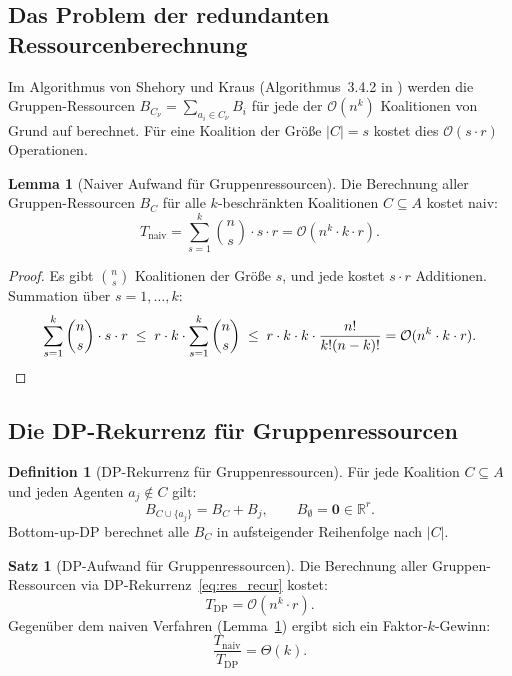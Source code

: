 \documentclass[a4paper,12pt]{article}
\theoremstyle{definition}
\newtheorem{definition}{Definition}
\newtheorem{satz}{Satz}
\newtheorem{lemma}{Lemma}
\begin{document}
\subsection{Das Problem der redundanten Ressourcenberechnung}

Im Algorithmus von Shehory und Kraus (Algorithmus~3.4.2 in \cite{sk98}) werden
die Gruppen-Ressourcen $B_{C_\nu} = \sum_{a_i \in C_\nu} B_i$ f\"{u}r jede der
$\mathcal{O}(n^k)$ Koalitionen von Grund auf berechnet. F\"{u}r eine Koalition
der Gr\"{o}{\ss}e $|C| = s$ kostet dies $\mathcal{O}(s \cdot r)$ Operationen.

\begin{lemma}[Naiver Aufwand f\"{u}r Gruppenressourcen]
    \label{lemma:naive_cost}
    Die Berechnung aller Gruppen-Ressourcen $B_C$ f\"{u}r alle
    $k$-beschr\"{a}nkten Koalitionen $C \subseteq A$ kostet naiv:
    \[
        T_{\mathrm{naiv}} = \sum_{s=1}^k \binom{n}{s} \cdot s \cdot r
        = \mathcal{O}(n^k \cdot k \cdot r).
    \]
\end{lemma}

\begin{proof}
    Es gibt $\binom{n}{s}$ Koalitionen der Gr\"{o}{\ss}e $s$, und jede kostet
    $s \cdot r$ Additionen. Summation \"{u}ber $s = 1, \ldots, k$:
    \[
        \sum_{s=1}^k \binom{n}{s} \cdot s \cdot r
        \;\leq\; r \cdot k \cdot \sum_{s=1}^k \binom{n}{s}
        \;\leq\; r \cdot k \cdot k \cdot \frac{n!}{k!(n-k)!}
        = \mathcal{O}(n^k \cdot k \cdot r). \qedhere
    \]
\end{proof}

\subsection{Die DP-Rekurrenz f\"{u}r Gruppenressourcen}

\begin{definition}[DP-Rekurrenz f\"{u}r Gruppenressourcen]
    F\"{u}r jede Koalition $C \subseteq A$ und jeden Agenten $a_j \notin C$ gilt:
    \begin{equation}
        B_{C \cup \{a_j\}} = B_C + B_j, \qquad B_\emptyset = \mathbf{0} \in \mathbb{R}^r.
        \label{eq:res_recur}
    \end{equation}
    Bottom-up-DP berechnet alle $B_C$ in aufsteigender Reihenfolge nach $|C|$.
\end{definition}

\begin{satz}[DP-Aufwand f\"{u}r Gruppenressourcen]
    \label{satz:dp_res}
    Die Berechnung aller Gruppen-Ressourcen via DP-Rekurrenz~\eqref{eq:res_recur}
    kostet:
    \[
        T_{\mathrm{DP}} = \mathcal{O}(n^k \cdot r).
    \]
    Gegen\"{u}ber dem naiven Verfahren (Lemma~\ref{lemma:naive_cost}) ergibt sich
    ein Faktor-$k$-Gewinn:
    \[
        \frac{T_{\mathrm{naiv}}}{T_{\mathrm{DP}}} = \Theta(k).
    \]
\end{satz}
\end{document}
